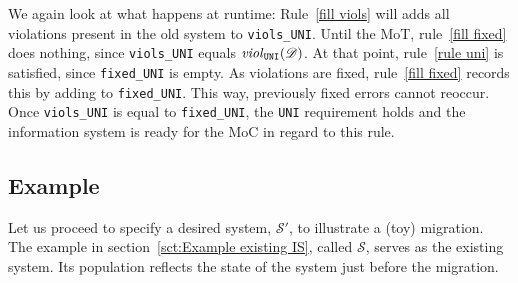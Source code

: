 \documentclass[runningheads]{llncs}
\newcommand{\id}[1]{\text{\it #1\/}}
\newcommand{\viol}[2]{\violC{#1}(#2)}
\newcommand{\violC}[1]{\id{viol}_{#1}}
\newcommand{\dataset}{\mathscr{D}}
\newcommand{\infsys}{\mathscr{S}}
\begin{document}
   We again look at what happens at runtime:
   Rule~\ref{fill viols} will adds all violations present in the old system to {\tt viols\_UNI}.
   Until the MoT, rule~\ref{fill fixed} does nothing, since {\tt viols\_UNI} equals $\viol{\tt UNI}{\dataset}$.
   At that point, rule~\ref{rule uni} is satisfied, since {\tt fixed\_UNI} is empty.
   As violations are fixed, rule~\ref{fill fixed} records this by adding to {\tt fixed\_UNI}.
   This way, previously fixed errors cannot reoccur.
   Once {\tt viols\_UNI} is equal to {\tt fixed\_UNI}, the \verb=UNI= requirement holds and the information system is ready for the MoC in regard to this rule.
   
   


\subsection{Example}
   Let us proceed to specify a desired system, $\infsys'$, to illustrate a (toy) migration.
   The example in section~\ref{sct:Example existing IS}, called $\infsys$, serves as the existing system.
   Its population reflects the state of the system just before the migration.
\end{document}
